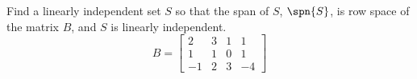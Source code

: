 Find a linearly independent set $S$ so that the span of $S$, $\spn{S}$, is row space of the matrix $B$, and $S$ is linearly independent. 
%
\begin{equation*}
B=
\begin{bmatrix}
2 & 3 & 1 & 1\\
1 & 1 & 0 & 1\\
-1 & 2 & 3 & -4
\end{bmatrix}
\end{equation*}
